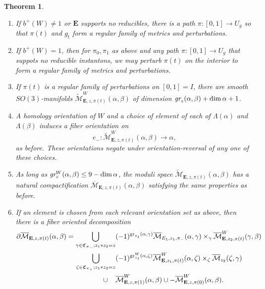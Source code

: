 \documentclass{memo-l}
\newtheorem{theorem}{Theorem}[chapter]
\theoremstyle{definition}
\theoremstyle{remark}
\numberwithin{section}{chapter}
\numberwithin{equation}{chapter}
\begin{document}
\begin{theorem}
\begin{enumerate}
\item If $b^+(W) \neq 1$ or $\mathbf{E}$ supports no reducibles, there is a path $\pi: [0,1] \to U_g$ so that $\pi(t)$ and $g_t$ form a regular family of metrics and perturbations.
\item If $b^+(W) = 1$, then for $\pi_0, \pi_1$ as above and any path $\pi: [0,1] \to U_g$ that suppots no reducible instantons, we may perturb $\pi(t)$ on the interior to form a regular family of metrics and perturbations.\\
\item If $\pi(t)$ is a regular family of perturbations on $[0,1] = I$, there are smooth $SO(3)$-manifolds $\widetilde{\mathcal M}^W_{\mathbf{E},z,\pi(t)}(\alpha, \beta)$ of dimension $\text{\em{gr}}_z(\alpha, \beta) + \dim \alpha + 1$. \\
\item A homology orientation of $W$ and a choice of element of each of $\Lambda(\alpha)$ and $\Lambda(\beta)$ induces a fiber orientation on $$e_-: \widetilde{\mathcal M}^W_{\mathbf{E},z,\pi(t)}(\alpha, \beta) \to \alpha,$$ as before. These orientations negate under orientation-reversal of any one of these choices.\\
\item As long as $\text{\em{gr}}^W_z(\alpha, \beta) \leq 9 - \dim \alpha$, the moduli space $\widetilde{\mathcal M}_{\mathbf{E},z,\pi(t)}(\alpha, \beta)$ has a natural compactification $\overline{\mathcal M}_{\mathbf{E},z,\pi(t)}(\alpha, \beta)$ satisfying the same properties as before.\\
\item If an element is chosen from each relevant orientation set as above, then there is a fiber oriented decomposition \begin{align*}\partial \overline{\mathcal M}_{\mathbf E,z,\pi(t)}(\alpha, \beta) = \bigcup_{\gamma \in \mathfrak C_{\pi_-}; z_1 \ast z_2 = z} &(-1)^{\textup{gr}_{z_1}(\alpha, \gamma)}\overline{\mathcal M}_{E_1,z_1,\pi_-}(\alpha, \gamma) \times_\gamma \overline{\mathcal M}^W_{\mathbf{E},z_2,\pi(t)}(\gamma, \beta)\\
\bigcup_{\zeta \in \mathfrak C_{\pi_+}; z_1 \ast z_2 = z} &(-1)^{\textup{gr}^{W}_{z_1}(\alpha, \zeta)} \overline{\mathcal M}^W_{\mathbf{E}, z_1,\pi(t)}(\alpha, \zeta) \times_\zeta \overline{\mathcal M}_{z_2}(\zeta, \gamma)\\
\cup \; \; \; \; &\overline{\mathcal M}^W_{\mathbf{E},z,\pi(1)}(\alpha, \beta) \cup -\overline{\mathcal M}^W_{\mathbf{E},z,\pi(0)}(\alpha, \beta).\\
\end{align*}


\end{enumerate}
\end{theorem}
\end{document}
